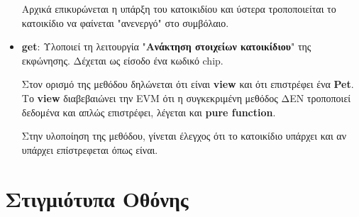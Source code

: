 \documentclass[12pt,a4paper]{article}
\begin{document}
\begin{itemize}
    Αρχικά επικυρώνεται η υπάρξη του κατοικιδίου και ύστερα τροποποιείται το κατοικίδιο να φαίνεται "ανενεργό" στο συμβόλαιο.

    \item \textbf{get}: Υλοποιεί τη λειτουργία "\textbf{Ανάκτηση στοιχείων κατοικίδιου}" της εκφώνησης. Δέχεται ως είσοδο ένα κωδικό chip.
    
    Στον ορισμό της μεθόδου δηλώνεται ότι είναι \textbf{view} και ότι επιστρέφει ένα \textbf{Pet}. Το \textbf{view} διαβεβαιώνει την EVM ότι η συγκεκριμένη μεθόδος ΔΕΝ τροποποιεί δεδομένα και απλώς επιστρέφει, λέγεται και \textbf{pure function}.
    
    Στην υλοποίηση της μεθόδου, γίνεται έλεγχος ότι το κατοικίδιο υπάρχει και αν υπάρχει επίστρεφεται όπως είναι.
\end{itemize}

\section{Στιγμιότυπα Οθόνης}
\end{document}
